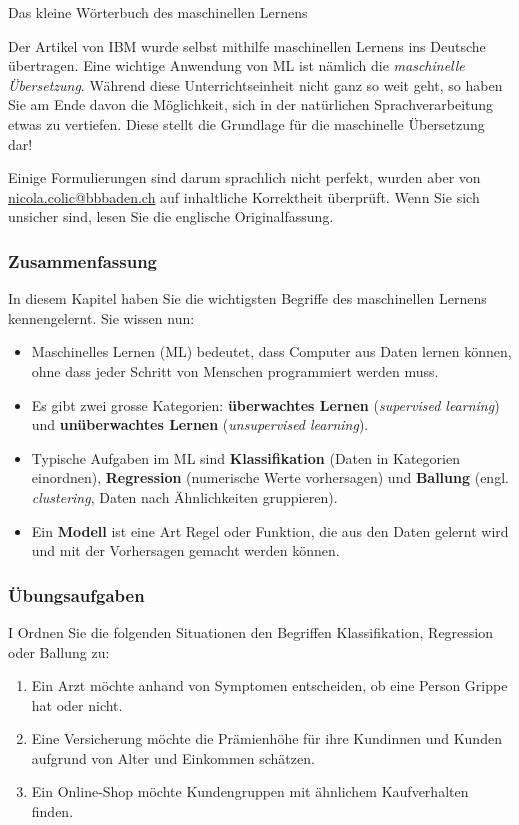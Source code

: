 \begin{lpu}{Das kleine Wörterbuch des maschinellen Lernens}
\begin{hinweis}
    Der Artikel von IBM wurde selbst mithilfe maschinellen Lernens ins Deutsche übertragen. Eine wichtige Anwendung von ML ist nämlich die \textit{maschinelle Übersetzung}. Während diese Unterrichtseinheit nicht ganz so weit geht, so haben Sie am Ende davon die Möglichkeit, sich in der natürlichen Sprachverarbeitung etwas zu vertiefen. Diese stellt die Grundlage für die maschinelle Übersetzung dar! 
    
    Einige Formulierungen sind darum sprachlich nicht perfekt, wurden aber von \url{nicola.colic@bbbaden.ch} auf inhaltliche Korrektheit überprüft. Wenn Sie sich unsicher sind, lesen Sie die englische Originalfassung.
\end{hinweis}

\subsubsection*{Zusammenfassung}

In diesem Kapitel haben Sie die wichtigsten Begriffe des maschinellen Lernens kennengelernt.  
Sie wissen nun: 
\begin{itemize}
  \item Maschinelles Lernen (ML) bedeutet, dass Computer aus Daten lernen können, ohne dass jeder Schritt von Menschen programmiert werden muss. 
  \item Es gibt zwei grosse Kategorien: \textbf{überwachtes Lernen} (\textit{supervised learning}) und \textbf{unüberwachtes Lernen} (\textit{unsupervised learning}). 
  \item Typische Aufgaben im ML sind \textbf{Klassifikation} (Daten in Kategorien einordnen), \textbf{Regression} (numerische Werte vorhersagen) und \textbf{Ballung} (engl. \textit{clustering}, Daten nach Ähnlichkeiten gruppieren).
  \item Ein \textbf{Modell} ist eine Art Regel oder Funktion, die aus den Daten gelernt wird und mit der Vorhersagen gemacht werden können. 
\end{itemize}

\subsubsection*{Übungsaufgaben}

\begin{aufgabe}{I}
Ordnen Sie die folgenden Situationen den Begriffen Klassifikation, Regression oder Ballung zu:
\begin{enumerate}
  \item Ein Arzt möchte anhand von Symptomen entscheiden, ob eine Person Grippe hat oder nicht.  
  \item Eine Versicherung möchte die Prämienhöhe für ihre Kundinnen und Kunden aufgrund von Alter und Einkommen schätzen.  
  \item Ein Online-Shop möchte Kundengruppen mit ähnlichem Kaufverhalten finden.  
\end{enumerate}
\end{aufgabe}


\end{lpu}
